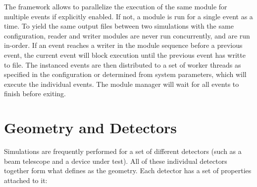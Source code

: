 The framework allows to parallelize the execution of the same module for multiple events if explicitly enabled.
If not, a module is run for a single event as a time.
To yield the same output files between two simulations with the same configuration, reader and writer modules are never run concurrently, and are run in-order.
If an event reaches a writer in the module sequence before a previous event, the current event will block execution until the previous event has writte to file.
The instanced events are then distributed to a set of worker threads as specified in the configuration or determined from system parameters, which will execute the individual events.
The module manager will wait for all events to finish before exiting.

\section{Geometry and Detectors}
\label{sec:models_geometry}
Simulations are frequently performed for a set of different detectors (such as a beam telescope and a device under test).
All of these individual detectors together form what \apsq defines as the geometry.
Each detector has a set of properties attached to it:
